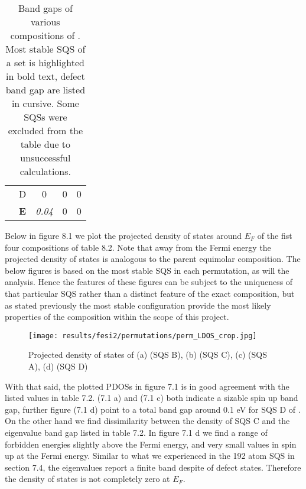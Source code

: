 \begin{table}[H]
\begin{tabular}{@{}ccccc@{}}
\multicolumn{1}{c|}{}                                       & D          & 0                                                                           & 0                                                                           & 0                                                                                 \\
\multicolumn{1}{c|}{}                                       & \textbf{E} & \textit{0.04}                                                               & 0                                                                           & 0                                                                                 \\ \bottomrule 
\end{tabular}
\caption{Band gaps of various compositions of . Most stable SQS of a set is highlighted in bold text, defect band gap are listed in cursive. Some SQSs were excluded from the table due to unsuccessful calculations.}
\end{table}

Below in figure 8.1 we plot the projected density of states around $E_F$ of the fist four compositions of table 8.2. Note that away from the Fermi energy the projected density of states is analogous to the parent equimolar composition. The below figures is based on the most stable SQS in each permutation, as will the analysis. Hence the features of these figures can be subject to the uniqueness of that particular SQS rather than a distinct feature of the exact composition, but as stated previously the most stable configuration provide the most likely properties of the composition within the scope of this project. 

\begin{figure}[H]
\texttt{[image: results/fesi2/permutations/perm\_LDOS\_crop.jpg]}
\caption{Projected density of states of (a)  (SQS B), (b)  (SQS C), (c)  (SQS A), (d)  (SQS D)}
\end{figure}

With that said, the plotted PDOSs in figure 7.1 is in good agreement with the listed values in table 7.2.  (7.1 a) and  (7.1 c) both indicate a sizable spin up band gap, further figure (7.1 d) point to a total band gap around 0.1 eV for SQS D of . On the other hand we find dissimilarity between the density of  SQS C and the eigenvalue band gap listed in table 7.2. In figure 7.1 d we find a range of forbidden energies slightly above the Fermi energy, and very small values in spin up at the Fermi energy. Similar to what we experienced in the 192 atom SQS in section 7.4, the eigenvalues report a finite band despite of defect states. Therefore the density of states is not completely zero at $E_F$. 

